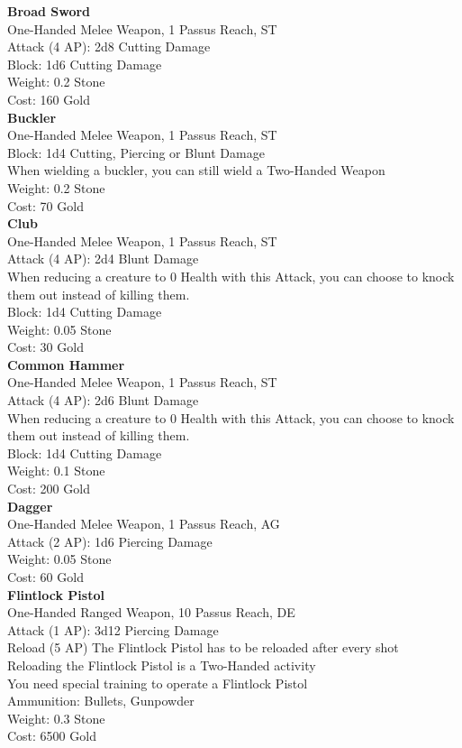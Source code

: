 \textbf{Broad Sword}\\
One-Handed Melee Weapon, 1 Passus Reach, ST\\
Attack (4 AP): 2d8 Cutting Damage\\
Block: 1d6 Cutting Damage\\
Weight: 0.2 Stone\\
Cost: 160 Gold\\


\textbf{Buckler}\\
One-Handed Melee Weapon, 1 Passus Reach, ST\\
Block: 1d4 Cutting, Piercing or Blunt Damage\\
When wielding a buckler, you can still wield a Two-Handed Weapon\\
Weight: 0.2 Stone\\
Cost: 70 Gold\\


\textbf{Club}\\
One-Handed Melee Weapon, 1 Passus Reach, ST\\
Attack (4 AP): 2d4 Blunt Damage\\
When reducing a creature to 0 Health with this Attack, you can choose to knock them out instead of killing them.\\
Block: 1d4 Cutting Damage\\
Weight: 0.05 Stone\\
Cost: 30 Gold\\


\textbf{Common Hammer}\\
One-Handed Melee Weapon, 1 Passus Reach, ST\\
Attack (4 AP): 2d6 Blunt Damage\\
When reducing a creature to 0 Health with this Attack, you can choose to knock them out instead of killing them.\\
Block: 1d4 Cutting Damage\\
Weight: 0.1 Stone\\
Cost: 200 Gold\\


\textbf{Dagger}\\
One-Handed Melee Weapon, 1 Passus Reach, AG\\
Attack (2 AP): 1d6 Piercing Damage\\
Weight: 0.05 Stone\\
Cost: 60 Gold\\


\textbf{Flintlock Pistol}\\
One-Handed Ranged Weapon, 10 Passus Reach, DE\\
Attack (1 AP): 3d12 Piercing Damage\\
Reload (5 AP) The Flintlock Pistol has to be reloaded after every shot\\
Reloading the Flintlock Pistol is a Two-Handed activity\\
You need special training to operate a Flintlock Pistol\\
Ammunition: Bullets, Gunpowder\\
Weight: 0.3 Stone\\
Cost: 6500 Gold\\


